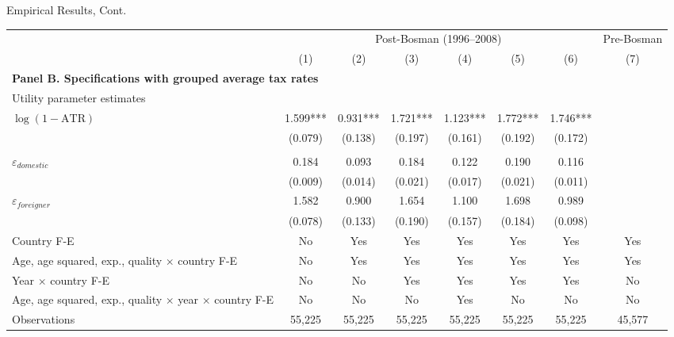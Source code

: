 \documentclass[aspectratio=169,professionalfonts]{beamer}
\begin{document}
\begin{frame}{Empirical Results, Cont.}
  \scriptsize
  \centering

  \begin{tabular}{lccccccc}
  \toprule
  & \multicolumn{6}{c}{Post-Bosman (1996--2008)} & Pre-Bosman \\
  & (1) & (2) & (3) & (4) & (5) & (6) & (7) \\
  \midrule

  \multicolumn{8}{l}{\textbf{Panel B. Specifications with grouped average tax rates}} \\

  \multicolumn{8}{l}{Utility parameter estimates} \\
  $\log(1-\mathrm{ATR})$
  & 1.599*** & 0.931*** & 1.721*** & 1.123*** & 1.772*** & 1.746*** &  \\
  & (0.079) & (0.138) & (0.197) & (0.161) & (0.192) & (0.172) &  \\

  \addlinespace
  \multicolumn{8}{l}{Implied elasticities} \\
  $\varepsilon_{domestic}$
  & 0.184 & 0.093 & 0.184 & 0.122 & 0.190 & 0.116 &  \\
  & (0.009) & (0.014) & (0.021) & (0.017) & (0.021) & (0.011) &  \\

  $\varepsilon_{foreigner}$
  & 1.582 & 0.900 & 1.654 & 1.100 & 1.698 & 0.989 &  \\
  & (0.078) & (0.133) & (0.190) & (0.157) & (0.184) & (0.098) &  \\

  \addlinespace
  Country F-E
  & No & Yes & Yes & Yes & Yes & Yes & Yes \\

  Age, age squared, exp., quality $\times$ country F-E
  & No & Yes & Yes & Yes & Yes & Yes & Yes \\

  Year $\times$ country F-E
  & No & No & Yes & Yes & Yes & Yes & No \\

  Age, age squared, exp., quality $\times$ year $\times$ country F-E
  & No & No & No & Yes & No & No & No \\

  Observations
  & 55{,}225 & 55{,}225 & 55{,}225 & 55{,}225 & 55{,}225 & 55{,}225 & 45{,}577 \\

  \bottomrule
  \end{tabular}

\end{frame}
\end{document}

